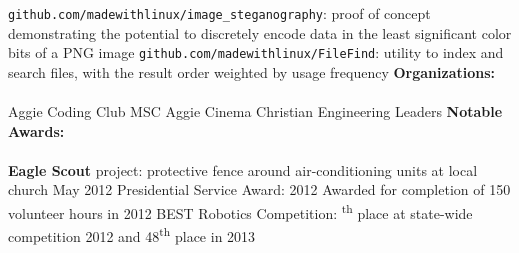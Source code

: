 \documentclass[12pt]{article}
\newcommand{\upspace}{\vspace{0px}}
\newcommand{\zzz}[1]{\upspace \0 \textbf{#1} \\ \vspace{-0.7\baselineskip} \hrulefill \vspace{-2px} \\ }
\newcommand{\aaa}{\upspace \1}
\newcommand{\bbb}{\upspace \2}
\begin{document}
\begin{flushleft}
\begin{outline}[compactitem]
	\aaa \verb|github.com/madewithlinux/image_steganography|: proof of concept demonstrating the potential to discretely encode data in the least significant color bits of a PNG image
	\aaa \verb|github.com/madewithlinux/FileFind|: utility to index and search files, with the result order weighted by usage frequency
\zzz{Organizations:}
	\aaa Aggie Coding Club \hfill{}\hspace{1px} MSC Aggie Cinema \hfill{}\hspace{1px} Christian Engineering Leaders
\zzz{Notable Awards:}
	\aaa \textbf{Eagle Scout} project: protective fence around air-conditioning units at local church \hfill May 2012
	\aaa Presidential Service Award: \hfill 2012
		\bbb Awarded for completion of 150 volunteer hours in 2012
	\aaa BEST Robotics Competition:
		\bbb 5\textsuperscript{th} place at state-wide competition 2012 and 48\textsuperscript{th} place in 2013

\end{outline}
\end{flushleft}
\end{document}
